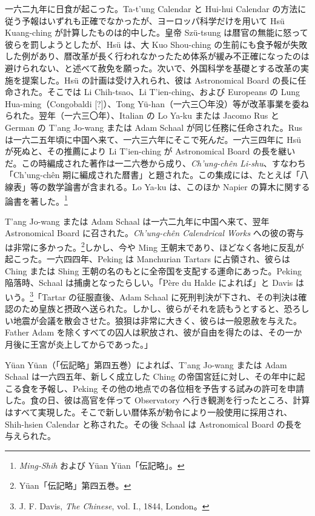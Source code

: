 \documentclass[11pt]{article}
\newcommand{\scanpage}[2]{\clearpage\setcounter{footnote}{0}\noindent{\footnotesize\color{gray}PDF #1 頁 · #2}\par\medskip}
\newcommand{\scanfooter}{}
\begin{document}
一六二九年に日食が起こった。Ta-t'ung Calendar と Hui-hui Calendar の方法に従う予報はいずれも正確でなかったが、ヨーロッパ科学だけを用いて Hsü Kuang-ching が計算したものは的中した。皇帝 Szü-tsung は暦官の無能に怒って彼らを罰しようとしたが、Hsü は、大 Kuo Shou-ching の生前にも食予報が失敗した例があり、暦改革が長く行われなかったため体系が緩み不正確になったのは避けられない、と述べて赦免を願った。次いで、外国科学を基礎とする改革の実施を提案した。Hsü の計画は受け入れられ、彼は Astronomical Board の長に任命された。そこでは Li Chih-tsao、Li T'ien-ching、および Europeans の Lung Hua-ming（Congobaldi [?]）、Tong Yü-han（一六三〇年没）等が改革事業を委ねられた。翌年（一六三〇年）、Italian の Lo Ya-ku または Jacomo Rus と German の T'ang Jo-wang または Adam Schaal が同じ任務に任命された。Rus は一六二五年頃に中国へ来て、一六三六年にそこで死んだ。一六三四年に Hsü が死ぬと、その推薦により Li T'ien-ching が Astronomical Board の長を継いだ。この時編成された著作は一二六巻から成り、\emph{Ch'ung-chên Li-shu}、すなわち「Ch'ung-chên 期に編成された暦書」と題された。この集成には、たとえば「八線表」等の数学論書が含まれる。Lo Ya-ku は、このほか Napier の算木に関する論書を著した。\footnote{\emph{Ming-Shih} および Yüan Yüan「伝記略」。}
\scanfooter

\scanpage{0129}{第17章、印刷頁115}
\setcounter{footnote}{0}
T'ang Jo-wang または Adam Schaal は一六二九年に中国へ来て、翌年 Astronomical Board に召された。\emph{Ch'ung-chên Calendrical Works} への彼の寄与は非常に多かった。\footnote{Yüan「伝記略」第四五巻。}しかし、今や Ming 王朝末であり、ほどなく各地に反乱が起こった。一六四四年、Peking は Manchurian Tartars に占領され、彼らは Ching または Shing 王朝の名のもとに全帝国を支配する運命にあった。Peking 陥落時、Schaal は捕虜となったらしい。「Père du Halde によれば」と Davis はいう。\footnote{J. F. Davis, \emph{The Chinese}, vol. I., 1844, London。}「Tartar の征服直後、Adam Schaal に死刑判決が下され、その判決は確認のため皇族と摂政へ送られた。しかし、彼らがそれを読もうとすると、恐ろしい地震が会議を散会させた。狼狽は非常に大きく、彼らは一般恩赦を与えた。Father Adam を除くすべての囚人は釈放され、彼が自由を得たのは、その一か月後に王宮が炎上してからであった。」

Yüan Yüan（「伝記略」第四五巻）によれば、T'ang Jo-wang または Adam Schaal は一六四五年、新しく成立した Ching の帝国宮廷に対し、その年中に起こる食を予報し、Peking その他の地点での各位相を予告する試みの許可を申請した。食の日、彼は高官を伴って Observatory へ行き観測を行ったところ、計算はすべて実現した。そこで新しい暦体系が勅令により一般使用に採用され、Shih-hsien Calendar と称された。その後 Schaal は Astronomical Board の長を与えられた。
\end{document}
